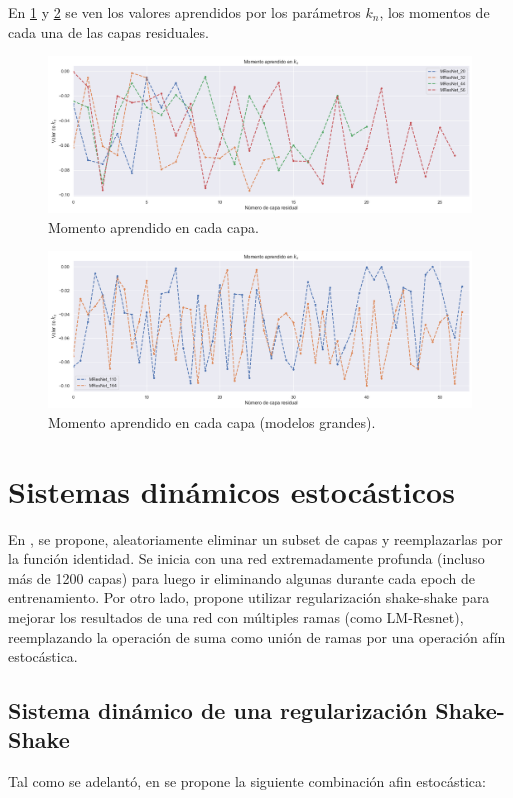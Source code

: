 \documentclass[titlepage,a4paper,oneside]{article}
\begin{document}
En \ref{momentum} y \ref{momentum_large} se ven los valores aprendidos por los parámetros $k_n$, los momentos de cada una de las capas residuales.

\begin{figure}[H]
\centering
\includegraphics[width=\textwidth]{images/momentum.png}
\caption{Momento aprendido en cada capa.}
\label{momentum}
\end{figure}

\begin{figure}[H]
\centering
\includegraphics[width=\textwidth]{images/momentum_large.png}
\caption{Momento aprendido en cada capa (modelos grandes).}
\label{momentum_large}
\end{figure}


\section{Sistemas dinámicos estocásticos}
En \cite{huang2016deep}, se propone, aleatoriamente eliminar un subset de capas y reemplazarlas por la función identidad. Se inicia con una red extremadamente profunda (incluso más de 1200 capas) para luego ir eliminando algunas durante cada epoch de entrenamiento. Por otro lado, \cite{gastaldi2017shakeshake} propone utilizar regularización shake-shake para mejorar los resultados de una red con múltiples ramas (como LM-Resnet), reemplazando la operación de suma como unión de ramas por una operación afín estocástica.

\subsection{Sistema dinámico de una regularización Shake-Shake}
Tal como se adelantó, en \cite{gastaldi2017shakeshake} se propone la siguiente combinación afin estocástica:
\end{document}
